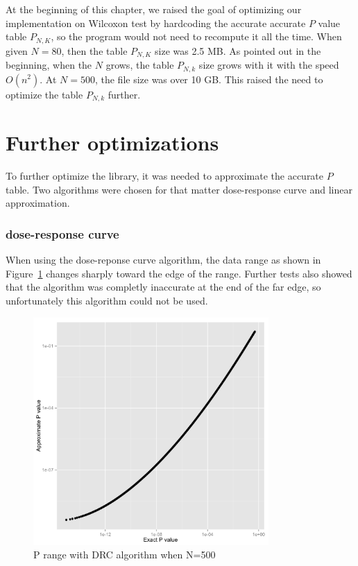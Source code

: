 \documentclass[12pt]{article}
\begin{document}
At the beginning of this chapter, we raised the goal of optimizing our implementation on Wilcoxon test by hardcoding the accurate accurate $P$ value table $P_{N, K}$, so the program would not need to recompute it all the time. When given $N = 80$, then the table $P_{N, K}$ size was 2.5 MB. As pointed out in the beginning, when the $N$ grows, the table $P_{N, k}$ size grows with it with the speed $O(n^2)$. At $N = 500$, the file size was over 10 GB. This raised the need to optimize the table $P_{N, k}$ further.

\section{Further optimizations}

To further optimize the library, it was needed to approximate the accurate $P$ table. Two algorithms were chosen for that matter dose-response curve and linear approximation.

\subsubsection{dose-response curve}
When using the dose-reponse curve algorithm, the data range as shown in Figure~\ref{fig:PdivPapproxDrcWhenN500} changes sharply toward the edge of the range. Further tests also showed that the algorithm was completly inaccurate at the end of the far edge, so unfortunately this algorithm could not be used.

\begin{figure}[H]
  \centering
  \includegraphics[width=0.8\textwidth]{PvsP50}
  \caption{P range with DRC algorithm when N=500}
  \label{fig:PdivPapproxDrcWhenN500}
\end{figure}
\end{document}
